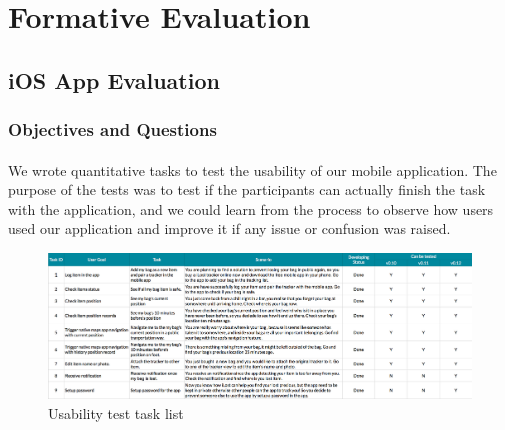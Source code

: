 \documentclass[12pt,a4paper]{article}
\begin{document}
    \section{Formative Evaluation}
      \subsection{iOS App Evaluation} 
        \subsubsection{Objectives and Questions}
          \paragraph{}
            We wrote quantitative tasks to test the usability of our mobile application\cite{WritingTasks}. The purpose of the tests was to test if the participants can actually finish the task with the application, and we could learn from the process to observe how users used our application and improve it if any issue or confusion was raised. 

            \begin{figure}[H]
              \centering
              \includegraphics[width=1\textwidth]{../assets/usability-test-task-list.png}
              \caption{Usability test task list}
              \label{fig:Usability test task list}
            \end{figure}
\end{document}
